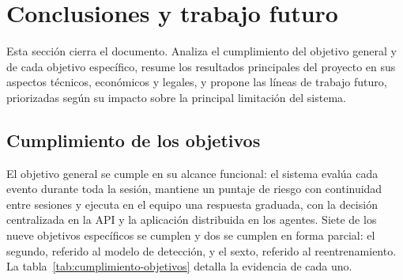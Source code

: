 \chapter{Conclusiones y trabajo futuro}\label{chap:conclusiones}

Esta sección cierra el documento. Analiza el cumplimiento del objetivo general y de cada objetivo
específico, resume los resultados principales del proyecto en sus aspectos técnicos, económicos y
legales, y propone las líneas de trabajo futuro, priorizadas según su impacto sobre la principal
limitación del sistema.

\section{Cumplimiento de los objetivos}\label{sec:cumplimiento-objetivos}
El objetivo general se cumple en su alcance funcional: el sistema evalúa cada evento durante toda
la sesión, mantiene un puntaje de riesgo con continuidad entre sesiones y ejecuta en el equipo una
respuesta graduada, con la decisión centralizada en la API y la aplicación distribuida en los
agentes. Siete de los nueve objetivos específicos se cumplen y dos se cumplen en forma parcial: el segundo, referido al modelo de detección, y el sexto, referido al reentrenamiento. La tabla~\ref{tab:cumplimiento-objetivos} detalla la evidencia de cada uno.

